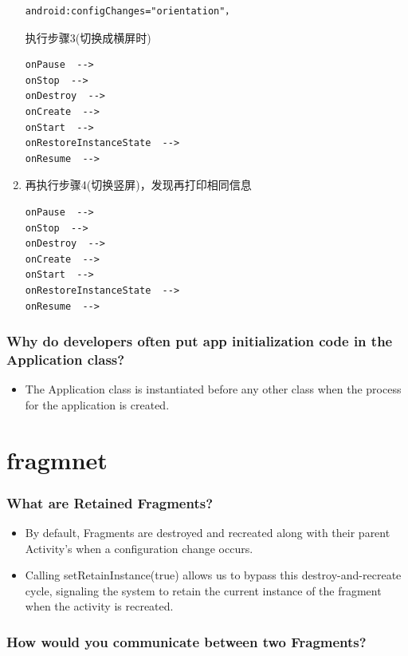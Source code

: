 \documentclass[9pt, b5paaper]{book}
\begin{document}
\begin{enumerate}
\begin{verbatim}
android:configChanges="orientation"，
\end{verbatim}
执行步骤3(切换成横屏时)
\begin{verbatim}
onPause  -->
onStop  -->
onDestroy  -->
onCreate  -->
onStart  -->
onRestoreInstanceState  -->
onResume  -->
\end{verbatim}
\item 再执行步骤4(切换竖屏)，发现再打印相同信息
\label{sec-5-0-1-6}
\begin{verbatim}
onPause  -->
onStop  -->
onDestroy  -->
onCreate  -->
onStart  -->
onRestoreInstanceState  -->
onResume  -->
\end{verbatim}
\end{enumerate}

\subsection{Why do developers often put app initialization code in the Application class?}
\label{sec-5-0-2}
\begin{itemize}
\item The Application class is instantiated before any other class when the process for the application is created.
\end{itemize}

\chapter{fragmnet}
\label{sec-6}
\subsection{What are Retained Fragments?}
\label{sec-6-0-1}
\begin{itemize}
\item By default, Fragments are destroyed and recreated along with their parent Activity’s when a configuration change occurs.
\item Calling setRetainInstance(true) allows us to bypass this destroy-and-recreate cycle, signaling the system to retain the current instance of the fragment when the activity is recreated.
\end{itemize}

\subsection{How would you communicate between two Fragments?}
\label{sec-6-0-2}
\end{document}
